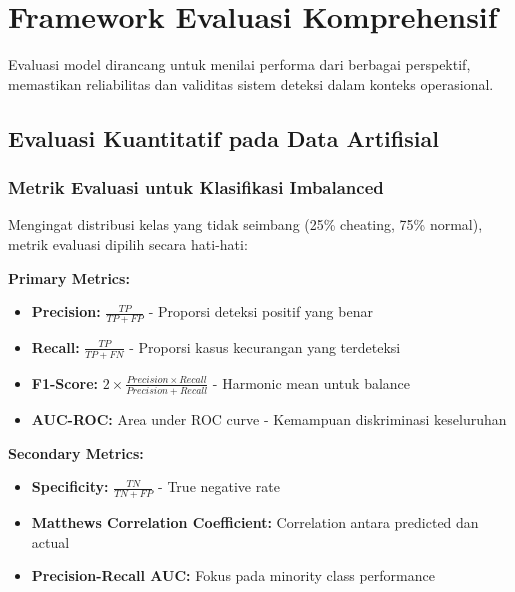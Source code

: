 \section{Framework Evaluasi Komprehensif}
\label{sec:frameworkEvaluasi}

Evaluasi model dirancang untuk menilai performa dari berbagai perspektif, memastikan reliabilitas dan validitas sistem deteksi dalam konteks operasional.

\subsection{Evaluasi Kuantitatif pada Data Artifisial}
\label{sec:evaluasiKuantitatif}

\subsubsection{Metrik Evaluasi untuk Klasifikasi Imbalanced}
\label{sec:metrikEvaluasi}

Mengingat distribusi kelas yang tidak seimbang (25\% cheating, 75\% normal), metrik evaluasi dipilih secara hati-hati:

\textbf{Primary Metrics:}
\begin{itemize}
    \item \textbf{Precision:} $\frac{TP}{TP + FP}$ - Proporsi deteksi positif yang benar
    \item \textbf{Recall:} $\frac{TP}{TP + FN}$ - Proporsi kasus kecurangan yang terdeteksi
    \item \textbf{F1-Score:} $2 \times \frac{Precision \times Recall}{Precision + Recall}$ - Harmonic mean untuk balance
    \item \textbf{AUC-ROC:} Area under ROC curve - Kemampuan diskriminasi keseluruhan
\end{itemize}

\textbf{Secondary Metrics:}
\begin{itemize}
    \item \textbf{Specificity:} $\frac{TN}{TN + FP}$ - True negative rate
    \item \textbf{Matthews Correlation Coefficient:} Correlation antara predicted dan actual
    \item \textbf{Precision-Recall AUC:} Fokus pada minority class performance
\end{itemize}

